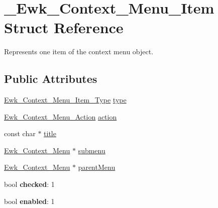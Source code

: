 \hypertarget{struct__Ewk__Context__Menu__Item}{\section{\+\_\+\+Ewk\+\_\+\+Context\+\_\+\+Menu\+\_\+\+Item Struct Reference}
\label{struct__Ewk__Context__Menu__Item}
}


Represents one item of the context menu object.  


\subsection*{Public Attributes}
\begin{DoxyCompactItemize}
\item 
\hyperlink{ewk__contextmenu_8h_ab8711abd6a20d021f8b47a5a8cdd3026}{Ewk\+\_\+\+Context\+\_\+\+Menu\+\_\+\+Item\+\_\+\+Type} \hyperlink{struct__Ewk__Context__Menu__Item_a5ded85edf55b8e2c3c10c77e4dffa1cf}{type}
\item 
\hyperlink{ewk__contextmenu_8h_aff1d945e92dd408188afc9bac4bd4344}{Ewk\+\_\+\+Context\+\_\+\+Menu\+\_\+\+Action} \hyperlink{struct__Ewk__Context__Menu__Item_af2d6b9c07e8639a1e9e13d7a80bfebd3}{action}
\item 
const char $\ast$ \hyperlink{struct__Ewk__Context__Menu__Item_a5726653c8bdb5c146a83b7450e4314e8}{title}
\item 
\hyperlink{ewk__contextmenu_8h_a1ebc92afff582d4daf4dfe8d628528ae}{Ewk\+\_\+\+Context\+\_\+\+Menu} $\ast$ \hyperlink{struct__Ewk__Context__Menu__Item_afc1cb2c48001028d2ac39904a822ec8e}{submenu}
\item 
\hyperlink{ewk__contextmenu_8h_a1ebc92afff582d4daf4dfe8d628528ae}{Ewk\+\_\+\+Context\+\_\+\+Menu} $\ast$ \hyperlink{struct__Ewk__Context__Menu__Item_a5f9759411cbaef982f55170b13a276a1}{parent\+Menu}
\item 
\hypertarget{struct__Ewk__Context__Menu__Item_acad6839791014a0ae239266c562483aa}{bool {\bfseries checked}\+: 1}\label{struct__Ewk__Context__Menu__Item_acad6839791014a0ae239266c562483aa}

\item 
\hypertarget{struct__Ewk__Context__Menu__Item_a535ae43936a2a2760ac5689c919f9af2}{bool {\bfseries enabled}\+: 1}\label{struct__Ewk__Context__Menu__Item_a535ae43936a2a2760ac5689c919f9af2}

\end{DoxyCompactItemize}


